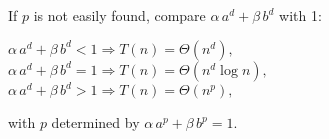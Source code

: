{\begin{minipage}[t]{0.49\textwidth}
\begin{center}
\end{center}\vspace*{-7px}
If $p$ is not easily found, compare $\alpha\,a^d+\beta\,b^d$ with 1:\\[-7px]
\begin{center}
$\alpha\,a^d+\beta\,b^d<1 \Rightarrow T(n)=\Theta(n^d),$\\
$\alpha\,a^d+\beta\,b^d=1 \Rightarrow T(n)=\Theta(n^d\log n),$\\
$\alpha\,a^d+\beta\,b^d>1 \Rightarrow T(n)=\Theta(n^p),$\\
\end{center}
\vspace{-7px}
with $p$ determined by $\alpha\,a^p+\beta\,b^p=1$.
\end{minipage}
} 